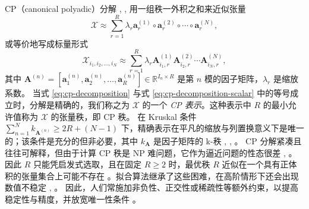\documentclass[11pt]{article}
\newcommand{\ten}[1]{\mathcal{#1}}
\newcommand{\mat}[1]{\mathbf{#1}}
\newcommand{\vecb}[1]{\mathbf{#1}}
\begin{document}
CP（canonical polyadic）分解 \cite{hitchcock1927cp}, \cite{carroll1970analysis}, \cite{harshman1970foundations} 用一组秩一外积之和来近似张量
\begin{equation}
\label{eq:cp-decomposition}
    \ten{X} \approx \sum_{r=1}^{R}\lambda_r \vecb{a}^{(1)}_r\circ\vecb{a}^{(2)}_r\circ\cdots\circ\vecb{a}^{(N)}_r,
\end{equation}
或等价地写成标量形式
\begin{equation}
\label{eq:cp-decomposition-scalar}
    \ten{X}_{i_1, i_2, \dots, i_N} \approx \sum_{r=1}^{R}\lambda_r \mat{A}^{(1)}_{i_1, r}\mat{A}^{(2)}_{i_2, r}\cdots\mat{A}^{(N)}_{i_N, r},
\end{equation}
其中 $\mat{A}^{(n)} = [\vecb{a}^{(n)}_1, \vecb{a}^{(n)}_2, \dots, \vecb{a}^{(n)}_R] \in \mathbb{R}^{I_n \times R}$ 是第 $n$ 模的因子矩阵，$\lambda_r$ 是缩放系数。
当式 \eqref{eq:cp-decomposition} 与式 \eqref{eq:cp-decomposition-scalar} 中的等号成立时，分解是精确的，我们称之为 $\ten{X}$ 的一个 \emph{CP 表示}。这种表示中 $R$ 的最小允许值称为 $\ten{X}$ 的张量秩，即 CP 秩。
在 Kruskal 条件 $\sum_{n=1}^N k_{\mat{A}^{(n)}} \ge 2R + (N-1)$ 下，精确表示在平凡的缩放与列置换意义下是唯一的；该条件是充分的但非必要，其中 $k_{\mat{A}}$ 是因子矩阵的 k-秩 \cite{kruskal1977three}, \cite{sidiropoulos2000cpuniqueness}, \cite{kolda2009tensor}。
CP 分解紧凑且往往可解释，但由于计算 CP 秩是 NP 难问题，它作为逼近问题的性态很差 \cite{haastad1990tensor}, \cite{hillar2013most}。因此 $R$ 只能凭启发式选取，且在固定 $R \ge 2$ 时，最优秩 $R$ 近似在一个具有正体积的张量集合上可能不存在 \cite{de2008tensor}。拟合算法继承了这些困难，在高阶情形下还会出现数值不稳定 \cite{kolda2009tensor}, \cite{cichocki2015tensor}。
因此，人们常施加非负性、正交性或稀疏性等额外约束，以提高稳定性与精度，并放宽唯一性条件 \cite{cichocki2015tensor}。

\end{document}

